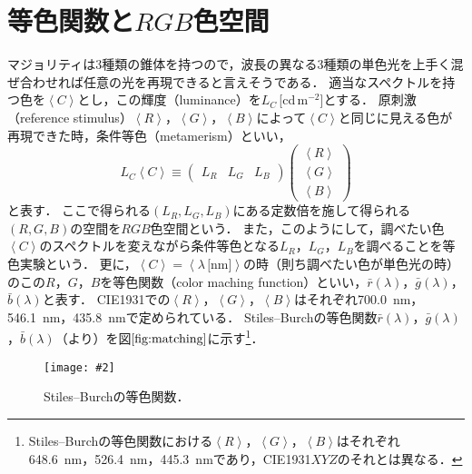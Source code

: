 \documentclass[uplatex,paper=a4,fontsize=4.0truemm,jafontsize=4.0truemm,head_space=30.0truemm,foot_space=30.0truemm,baselineskip=8.0truemm,line_length=40zw,gutter=25.0truemm,oneside,openany,fleqn,hanging_panctuation,open_bracket_pos=nibu_tentsuki,dvipdfmx,jis2004,book,titlepage]{jlreq}
\theoremstyle{mystyle}
\newcommand{\captiondot}[1]{\caption{#1．}}
\newcommand{\figureinput}[4]{\begin{figure}[tbp]\centering\texttt{[image: \#2]}\captiondot{#3}\label{fig:#4}\end{figure}}
\newcommand{\mathdisplaystyle}[1]{\(\displaystyle{#1}\)}
\newcommand{\Reference}[1]{\mathdisplaystyle{\ref{#1}}}
\newcommand{\negativevalue}[1]{{-#1}}
\newcommand{\parentheses}[1]{\left(#1\right)}
\newcommand{\anglebrackets}[1]{\left\langle#1\right\rangle}
\newcommand{\easymatrix}[1]{\mathord{\begin{pmatrix}#1\end{pmatrix}}}
\begin{document}
		\section{等色関数と\mathdisplaystyle{RGB}色空間}
			マジョリティは3種類の錐体を持つので，波長の異なる3種類の単色光を上手く混ぜ合わせれば任意の光を再現できると言えそうである．
			適当なスペクトルを持つ色を\mathdisplaystyle{\anglebrackets{C}}とし，この輝度（luminance）を\mathdisplaystyle{L_C}\,[cd\,\mathdisplaystyle{\textrm{m}^\negativevalue{2}}]とする．
			原刺激（reference stimulus）\mathdisplaystyle{\anglebrackets{R}}，\mathdisplaystyle{\anglebrackets{G}}，\mathdisplaystyle{\anglebrackets{B}}によって\mathdisplaystyle{\anglebrackets{C}}と同じに見える色が再現できた時，条件等色（metamerism）といい，
			\begin{equation*}
				L_C\anglebrackets{C}\equiv \easymatrix{L_R & L_G & L_B}\easymatrix{\anglebrackets{R} \\ \anglebrackets{G} \\ \anglebrackets{B}}
			\end{equation*}
			と表す．
			ここで得られる\mathdisplaystyle{\parentheses{L_R,L_G,L_B}}にある定数倍を施して得られる\mathdisplaystyle{\parentheses{R,G,B}}の空間を\mathdisplaystyle{RGB}色空間という．
			また，このようにして，調べたい色\mathdisplaystyle{\anglebrackets{C}}のスペクトルを変えながら条件等色となる\mathdisplaystyle{L_R}，\mathdisplaystyle{L_G}，\mathdisplaystyle{L_B}を調べることを等色実験という．
			更に，\mathdisplaystyle{\anglebrackets{C}=\anglebrackets{\lambda\,\textrm{[nm]}}}の時（則ち調べたい色が単色光の時）のこの\mathdisplaystyle{R}，\mathdisplaystyle{G}，\mathdisplaystyle{B}を等色関数（color maching function）といい，\mathdisplaystyle{\bar{r}\parentheses{\lambda}}，\mathdisplaystyle{\bar{g}\parentheses{\lambda}}，\mathdisplaystyle{\bar{b}\parentheses{\lambda}}と表す．
			CIE1931での\mathdisplaystyle{\anglebrackets{R}}，\mathdisplaystyle{\anglebrackets{G}}，\mathdisplaystyle{\anglebrackets{B}}はそれぞれ\SI{700.0}{nm}，\SI{546.1}{nm}，\SI{435.8}{nm}で定められている．
			Stiles--Burchの等色関数\mathdisplaystyle{\bar{r}\parentheses{\lambda}}，\mathdisplaystyle{\bar{g}\parentheses{\lambda}}，\mathdisplaystyle{\bar{b}\parentheses{\lambda}}（\cite{Stiles1955,Stiles1959}より）を図\Reference{fig:matching}に示す\footnote{Stiles--Burchの等色関数における\mathdisplaystyle{\anglebrackets{R}}，\mathdisplaystyle{\anglebrackets{G}}，\mathdisplaystyle{\anglebrackets{B}}はそれぞれ\SI{648.6}{nm}，\SI{526.4}{nm}，\SI{445.3}{nm}であり，CIE1931\mathdisplaystyle{XYZ}のそれとは異なる．}．
			\figureinput{width=\linewidth}{D:/a/figs/RGBcmf.png}{Stiles--Burchの等色関数}{matching}
\end{document}
